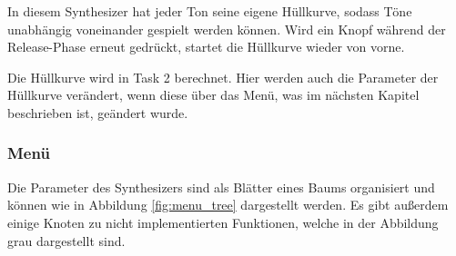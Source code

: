 In diesem Synthesizer hat jeder Ton seine eigene Hüllkurve, sodass Töne 
unabhängig voneinander gespielt werden können. Wird ein Knopf während der
Release-Phase erneut gedrückt, startet die
Hüllkurve wieder von vorne.

Die Hüllkurve wird in Task 2 berechnet. Hier werden auch die Parameter der Hüllkurve
verändert, wenn diese über das Menü, was im nächsten Kapitel beschrieben ist, 
geändert wurde.

\subsubsection{Menü}
\label{chap:menu}

Die Parameter des Synthesizers sind als Blätter eines Baums organisiert und 
können wie in Abbildung \ref{fig:menu_tree} dargestellt werden. Es gibt außerdem
einige Knoten zu nicht implementierten Funktionen, welche in der Abbildung grau
dargestellt sind.
